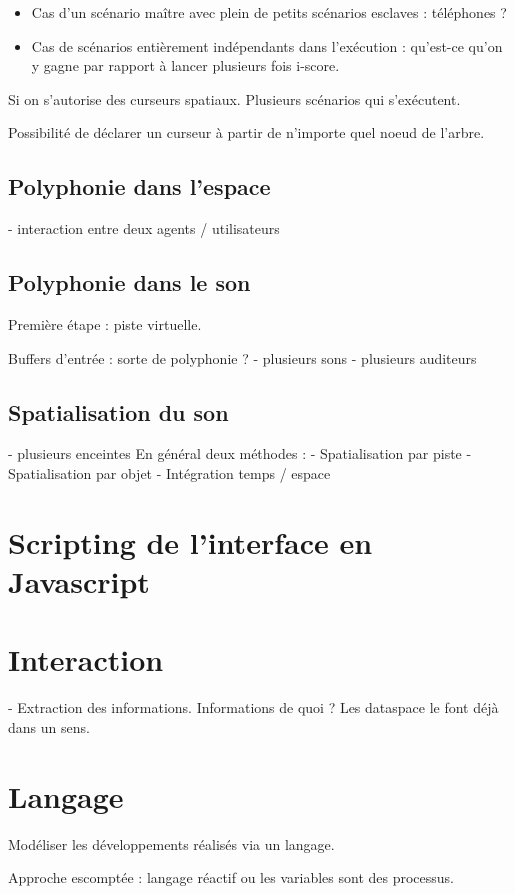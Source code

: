 \documentclass[french,a4paper,openany,12pt]{book}
\begin{document}
\begin{itemize}
\item Cas d'un scénario maître avec plein de petits scénarios esclaves : téléphones ? 
\item Cas de scénarios entièrement indépendants dans l'exécution : qu'est-ce qu'on y gagne par rapport à lancer plusieurs fois i-score.
\end{itemize}

Si on s'autorise des curseurs spatiaux.
Plusieurs scénarios qui s'exécutent.

Possibilité de déclarer un curseur à partir de n'importe quel noeud de l'arbre.

\subsection{Polyphonie dans l'espace}
- interaction entre deux agents / utilisateurs

\subsection{Polyphonie dans le son}
Première étape : piste virtuelle.

Buffers d'entrée : sorte de polyphonie ?
- plusieurs sons
- plusieurs auditeurs
\subsection{Spatialisation du son}
- plusieurs enceintes
En général deux méthodes :
- Spatialisation par piste
- Spatialisation par objet
- Intégration temps / espace
\section{Scripting de l'interface en Javascript}

\section{Interaction}
- Extraction des informations.
Informations de quoi ? Les dataspace le font déjà dans un sens.

\section{Langage}
Modéliser les développements réalisés via un langage.

Approche escomptée : langage réactif ou les variables sont des processus.
\end{document}
